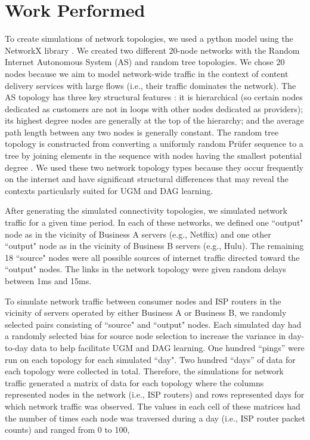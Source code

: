 \documentclass[conference]{IEEEtran}
\begin{document}
\section{Work Performed}

To create simulations of network topologies, we used a python model using the NetworkX library \cite{b14}. We created two different 20-node networks with the Random Internet Autonomous System (AS) and random tree topologies. We chose 20 nodes because we aim to model network-wide traffic in the context of content delivery services with large flows (i.e., their traffic dominates the network). The AS topology has three key structural features \cite{b15}: it is hierarchical (so certain nodes dedicated as customers are not in loops with other nodes dedicated as providers); its highest degree nodes are generally at the top of the hierarchy; and the average path length between any two nodes is generally constant. The random tree topology is constructed from converting a uniformly random Prüfer sequence to a tree by joining elements in the sequence with nodes having the smallest potential degree \cite{b16}. We used these two network topology types because they occur frequently on the internet and have significant structural differences that may reveal the contexts particularly suited for UGM and DAG learning. 

After generating the simulated connectivity topologies, we simulated network traffic for a given time period. In each of these networks, we defined one ``output" node as in the vicinity of Business A servers (e.g., Netflix) and one other ``output" node as in the vicinity of Business B servers (e.g., Hulu). The remaining 18 ``source" nodes were all possible sources of internet traffic directed toward the ``output" nodes. The links in the network topology were given random delays between 1ms and 15ms.

To simulate network traffic between consumer nodes and ISP routers in the vicinity of servers operated by either Business A or Business B, we randomly selected pairs consisting of ``source" and ``output" nodes. Each simulated day had a randomly selected bias for source node selection to increase the variance in day-to-day data to help facilitate UGM and DAG learning. One hundred ``pings” were run on each topology for each simulated ``day". Two hundred ``days” of data for each topology were collected in total. Therefore, the simulations for network traffic generated a matrix of data for each topology where the columns represented nodes in the network (i.e., ISP routers) and rows represented days for which network traffic was observed. The values in each cell of these matrices had the number of times each node was traversed during a day (i.e., ISP router packet counts) and ranged from 0 to 100,
\end{document}
